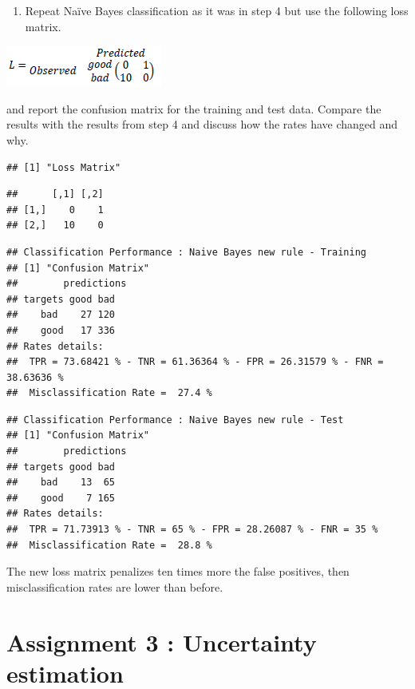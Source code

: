 \documentclass[
]{article}
\providecommand{\tightlist}{%
  \setlength{\itemsep}{0pt}\setlength{\parskip}{0pt}}
\begin{document}
\begin{enumerate}
\def\labelenumi{\arabic{enumi}.}
\setcounter{enumi}{5}
\tightlist
\item
  Repeat Naïve Bayes classification as it was in step 4 but use the
  following loss matrix.
\end{enumerate}

\begin{center}\includegraphics[height=0.1\textheight]{img/loss_matrix} \end{center}

and report the confusion matrix for the training and test data. Compare
the results with the results from step 4 and discuss how the rates have
changed and why.

\begin{verbatim}
## [1] "Loss Matrix"
\end{verbatim}

\begin{verbatim}
##      [,1] [,2]
## [1,]    0    1
## [2,]   10    0
\end{verbatim}

\begin{verbatim}
## Classification Performance : Naive Bayes new rule - Training 
## [1] "Confusion Matrix"
##        predictions
## targets good bad
##    bad    27 120
##    good   17 336
## Rates details:
##  TPR = 73.68421 % - TNR = 61.36364 % - FPR = 26.31579 % - FNR = 38.63636 %
##  Misclassification Rate =  27.4 %
\end{verbatim}

\begin{verbatim}
## Classification Performance : Naive Bayes new rule - Test 
## [1] "Confusion Matrix"
##        predictions
## targets good bad
##    bad    13  65
##    good    7 165
## Rates details:
##  TPR = 71.73913 % - TNR = 65 % - FPR = 28.26087 % - FNR = 35 %
##  Misclassification Rate =  28.8 %
\end{verbatim}

The new loss matrix penalizes ten times more the false positives, then
misclassification rates are lower than before.

\hypertarget{assignment-3-uncertainty-estimation}{%
\section{Assignment 3 : Uncertainty
estimation}\label{assignment-3-uncertainty-estimation}}
\end{document}
